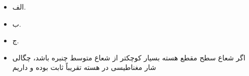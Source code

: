 \begin{ELjoin}
\begin{ELexample}{}
\begin{ELsolution}

\begin{itemize}
\tightlist
\item
  الف.
\end{itemize}


\begin{itemize}
\tightlist
\item
  ب.
\end{itemize}


\begin{itemize}
\tightlist
\item
  ج.
\end{itemize}


\end{ELsolution}

\end{ELexample}

\end{ELjoin}

\begin{ELjoin}

\begin{itemize}
\tightlist
\item
  اگر شعاع سطح مقطع هسته بسیار کوچکتر از شعاع متوسط چنبره باشد، چگالی شار مغناطیسی در هسته تقریباً ثابت بوده و داریم
\end{itemize}


\begin{ELimportant}{}


\end{ELimportant}

\end{ELjoin}

